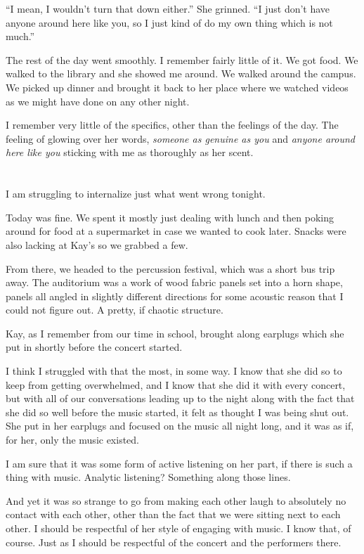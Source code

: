``I mean, I wouldn't turn that down either.'' She grinned. ``I just don't have anyone around here like you, so I just kind of do my own thing which is not much.''

The rest of the day went smoothly. I remember fairly little of it. We got food. We walked to the library and she showed me around. We walked around the campus. We picked up dinner and brought it back to her place where we watched videos as we might have done on any other night.

I remember very little of the specifics, other than the feelings of the day. The feeling of glowing over her words, \emph{someone as genuine as you} and \emph{anyone around here like you} sticking with me as thoroughly as her scent.

\section{}

I am struggling to internalize just what went wrong tonight.

Today was fine. We spent it mostly just dealing with lunch and then poking around for food at a supermarket in case we wanted to cook later. Snacks were also lacking at Kay's so we grabbed a few.

From there, we headed to the percussion festival, which was a short bus trip away. The auditorium was a work of wood fabric panels set into a horn shape, panels all angled in slightly different directions for some acoustic reason that I could not figure out. A pretty, if chaotic structure.

Kay, as I remember from our time in school, brought along earplugs which she put in shortly before the concert started.

I think I struggled with that the most, in some way. I know that she did so to keep from getting overwhelmed, and I know that she did it with every concert, but with all of our conversations leading up to the night along with the fact that she did so well before the music started, it felt as thought I was being shut out. She put in her earplugs and focused on the music all night long, and it was as if, for her, only the music existed.

I am sure that it was some form of active listening on her part, if there is such a thing with music. Analytic listening? Something along those lines.

And yet it was so strange to go from making each other laugh to absolutely no contact with each other, other than the fact that we were sitting next to each other. I should be respectful of her style of engaging with music. I know that, of course. Just as I should be respectful of the concert and the performers there.


